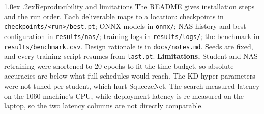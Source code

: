 \documentclass[10pt,a4paper]{article}
\makeatletter
\renewcommand\section{\@startsection{section}{1}{\z@}{-2.2ex \@plus -1ex \@minus -.2ex}%
  {1.0ex \@plus .2ex}{\normalfont\large\bfseries}}
\newcommand{\code}[1]{\texttt{\small #1}}
\makeatother
\begin{document}
\section{Reproducibility and limitations}
The README gives installation steps and the run order. Each deliverable maps to a location:
checkpoints in \code{checkpoints/<run>/best.pt}; ONNX models in \code{onnx/}; NAS history and best
configuration in \code{results/nas/}; training logs in \code{results/logs/}; the benchmark in
\code{results/benchmark.csv}. Design rationale is in \code{docs/notes.md}. Seeds are fixed, and every
training script resumes from \code{last.pt}.
\textbf{Limitations.} Student and NAS retraining were shortened to 20 epochs to fit the time budget,
so absolute accuracies are below what full schedules would reach. The KD hyper-parameters were not
tuned per student, which hurt SqueezeNet. The search measured latency on the 1060 machine's CPU, while
deployment latency is re-measured on the laptop, so the two latency columns are not directly
comparable.
\end{document}
